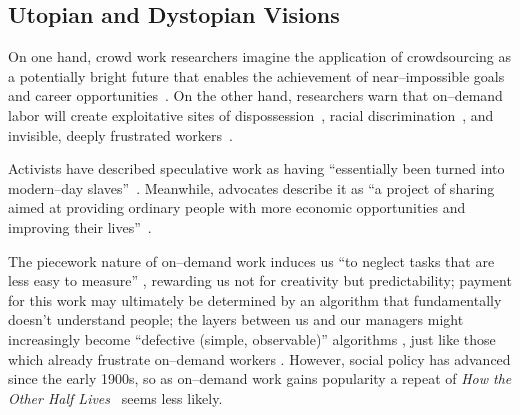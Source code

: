 \documentclass[trackingWork]{subfiles}
\begin{document}



\subsection{Utopian and Dystopian Visions}\label{sec:polarizationOfCrowdWork}
On one hand, crowd work researchers
imagine the application of crowdsourcing as
a potentially bright future that enables the achievement of near--impossible goals and career opportunities~\cite{redballoon,crowdworkFuture,vizwiz,suzukiAtelier}.
On the other hand, researchers
warn that on--demand labor will create exploitative sites of dispossession~\cite{scholz2012digital},
racial discrimination~\cite{edelman2015racial},
and invisible, deeply frustrated workers~\cite{turkopticon,bighamHalfWorkday}.

Activists have described speculative work as having
``essentially been turned into modern--day slaves''~\cite{activistsHuffPoLawsuit}.
Meanwhile, advocates describe it as
``a project of sharing
aimed at providing ordinary people
with more economic opportunities and
improving their lives''~\cite{uberPropaganda}.

The piecework nature of on--demand work induces us
``to neglect tasks that are less easy to measure'' \cite{SJOE:SJOE371},
rewarding us not for creativity but predictability;
payment for this work may ultimately be determined by
an algorithm that fundamentally doesn't understand people;
the layers between us and our managers might increasingly become
``defective (simple, observable)'' algorithms \cite{10.2307/2555446},
just like those which already frustrate
on--demand workers
\cite{uberAlgorithm,dynamo,turkopticon}.
However, social policy has advanced since the early 1900s, so as on--demand work gains popularity a repeat of \textit{How the Other Half Lives}~\cite{riisOtherSideLives} seems less likely.
\end{document}
